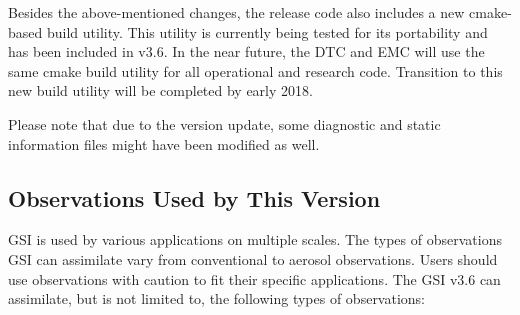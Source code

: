 Besides the above-mentioned changes, the release code also includes a new cmake-based build utility. This utility is currently being tested for its portability and has been included in v3.6. In the near future, the DTC and EMC will use the same cmake build utility for all operational and research code. Transition to this new build utility will be completed by early 2018.

Please note that due to the version update, some diagnostic and static information files might have been modified as well. 

\subsection{Observations Used by This Version}

GSI is used by various applications on multiple scales. The types of observations GSI can assimilate vary from conventional to aerosol observations. Users should use observations with caution to fit their specific applications. The GSI v3.6 can assimilate, but is not limited to, the following types of observations:

